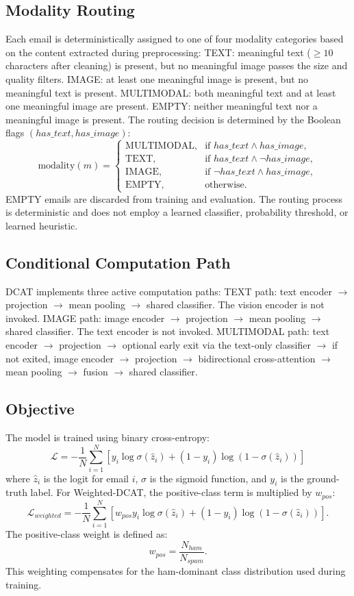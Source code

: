 \documentclass[conference]{IEEEtran}
\begin{document}
\subsection{Modality Routing}
Each email is deterministically assigned to one of four modality categories based on the content extracted during preprocessing:
TEXT: meaningful text ($\geq 10$ characters after cleaning) is present, but no meaningful image passes the size and quality filters.
IMAGE: at least one meaningful image is present, but no meaningful text is present.
MULTIMODAL: both meaningful text and at least one meaningful image are present.
EMPTY: neither meaningful text nor a meaningful image is present.
The routing decision is determined by the Boolean flags $(has\_text, has\_image)$:
\[
\text{modality}(m) = \begin{cases} \text{MULTIMODAL}, & \text{if } has\_text \wedge has\_image,\\ \text{TEXT}, & \text{if } has\_text \wedge \neg has\_image,\\ \text{IMAGE}, & \text{if } \neg has\_text \wedge has\_image,\\ \text{EMPTY}, & \text{otherwise.} \end{cases}
\]
EMPTY emails are discarded from training and evaluation. The routing process is deterministic and does not employ a learned classifier, probability threshold, or learned heuristic.
\subsection{Conditional Computation Path}
DCAT implements three active computation paths:
TEXT path: text encoder $\rightarrow$ projection $\rightarrow$ mean pooling $\rightarrow$ shared classifier. The vision encoder is not invoked.
IMAGE path: image encoder $\rightarrow$ projection $\rightarrow$ mean pooling $\rightarrow$ shared classifier. The text encoder is not invoked.
MULTIMODAL path: text encoder $\rightarrow$ projection $\rightarrow$ optional early exit via the text-only classifier $\rightarrow$ if not exited, image encoder $\rightarrow$ projection $\rightarrow$ bidirectional cross-attention $\rightarrow$ mean pooling $\rightarrow$ fusion $\rightarrow$ shared classifier.
\subsection{Objective}
The model is trained using binary cross-entropy:
\[
\mathcal{L} = -\frac{1}{N} \sum_{i=1}^{N} \left[ y_i \log \sigma(\hat{z}_i) + (1-y_i)\log(1-\sigma(\hat{z}_i)) \right]
\]
where $\hat{z}_i$ is the logit for email $i$, $\sigma$ is the sigmoid function, and $y_i$ is the ground-truth label.
For Weighted-DCAT, the positive-class term is multiplied by $w_{pos}$:
\[
\mathcal{L}_{weighted} = -\frac{1}{N} \sum_{i=1}^{N} \left[ w_{pos}y_i \log \sigma(\hat{z}_i) + (1-y_i)\log(1-\sigma(\hat{z}_i)) \right].
\]
The positive-class weight is defined as:
\[
w_{pos} = \frac{N_{ham}}{N_{spam}}.
\]
This weighting compensates for the ham-dominant class distribution used during training.
\end{document}
